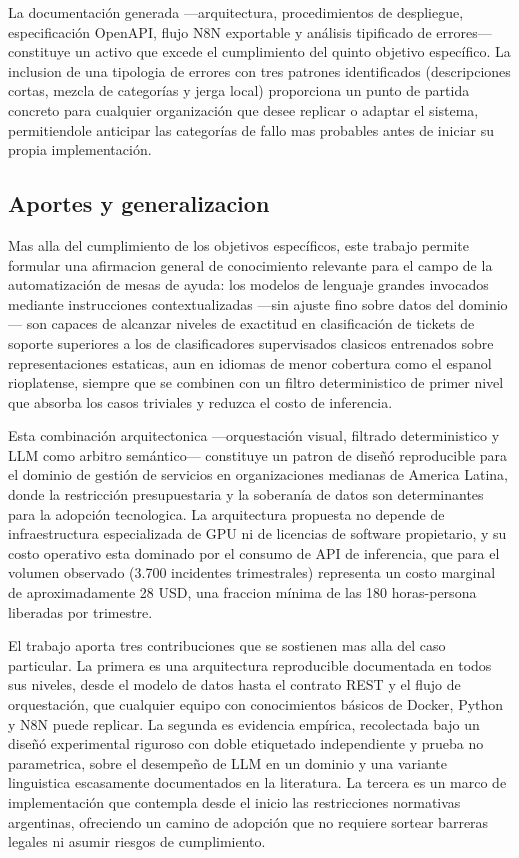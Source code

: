 La documentación generada ---arquitectura, procedimientos de despliegue, especificación OpenAPI, flujo N8N exportable y análisis tipificado de errores--- constituye un activo que excede el cumplimiento del quinto objetivo específico. La inclusion de una tipologia de errores con tres patrones identificados (descripciones cortas, mezcla de categorías y jerga local) proporciona un punto de partida concreto para cualquier organización que desee replicar o adaptar el sistema, permitiendole anticipar las categorías de fallo mas probables antes de iniciar su propia implementación.

\subsection{Aportes y generalizacion}

Mas alla del cumplimiento de los objetivos específicos, este trabajo permite formular una afirmacion general de conocimiento relevante para el campo de la automatización de mesas de ayuda: los modelos de lenguaje grandes invocados mediante instrucciones contextualizadas ---sin ajuste fino sobre datos del dominio--- son capaces de alcanzar niveles de exactitud en clasificación de tickets de soporte superiores a los de clasificadores supervisados clasicos entrenados sobre representaciones estaticas, aun en idiomas de menor cobertura como el espanol rioplatense, siempre que se combinen con un filtro deterministico de primer nivel que absorba los casos triviales y reduzca el costo de inferencia.

Esta combinación arquitectonica ---orquestación visual, filtrado deterministico y LLM como arbitro semántico--- constituye un patron de diseñó reproducible para el dominio de gestión de servicios en organizaciones medianas de America Latina, donde la restricción presupuestaria y la soberanía de datos son determinantes para la adopción tecnologica. La arquitectura propuesta no depende de infraestructura especializada de GPU ni de licencias de software propietario, y su costo operativo esta dominado por el consumo de API de inferencia, que para el volumen observado (3.700 incidentes trimestrales) representa un costo marginal de aproximadamente 28 USD, una fraccion mínima de las 180 horas-persona liberadas por trimestre.

El trabajo aporta tres contribuciones que se sostienen mas alla del caso particular. La primera es una arquitectura reproducible documentada en todos sus niveles, desde el modelo de datos hasta el contrato REST y el flujo de orquestación, que cualquier equipo con conocimientos básicos de Docker, Python y N8N puede replicar. La segunda es evidencia empírica, recolectada bajo un diseñó experimental riguroso con doble etiquetado independiente y prueba no parametrica, sobre el desempeño de LLM en un dominio y una variante linguistica escasamente documentados en la literatura. La tercera es un marco de implementación que contempla desde el inicio las restricciones normativas argentinas, ofreciendo un camino de adopción que no requiere sortear barreras legales ni asumir riesgos de cumplimiento.

\newpage
